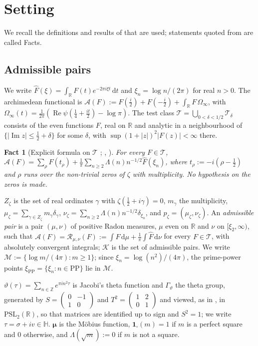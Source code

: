 \documentclass[11pt]{amsart}
\newcommand{\RR}{\mathbb R}
\newcommand{\ZZ}{\mathbb Z}
\newcommand{\dd}{\,\mathrm d}
\renewcommand{\Re}{\operatorname{Re}}
\renewcommand{\Im}{\operatorname{Im}}
\newcommand{\one}{\mathbf 1}
\newcommand{\hF}{\widehat F}
\newcommand{\xin}[1]{\xi_{#1}}
\newcommand{\BRS}{\mathcal M}
\newcommand{\xiPP}{\xi_{\mathrm{PP}}}
\newcommand{\PP}{\mathrm{PP}}
\newcommand{\Zz}{Z_\zeta}
\newcommand{\muz}{\mu_\zeta}
\newcommand{\nuz}{\nu_\zeta}
\newcommand{\pz}{p_\zeta}
\newcommand{\Oinf}{\Omega_\infty}
\newcommand{\Arch}{\mathcal A}
\newcommand{\Tc}{\mathcal T}
\newcommand{\Spec}{\mathcal R}
\newcommand{\Kad}{\mathcal K}
\newcommand{\uqpmat}[4]{\left(\begin{smallmatrix}#1&#2\\#3&#4\end{smallmatrix}\right)}
\newtheorem{fact}[theorem]{Fact}
\theoremstyle{definition}
\theoremstyle{remark}
\numberwithin{equation}{section}
\begin{document}
\section{Setting}\label{sec:setting}

We recall the definitions and results of \cite{PaperI} that are used; statements quoted from \cite{PaperI} are called Facts.

\subsection{Admissible pairs}\label{ssec:pairs}
We write $\hF(\xi)=\int_\RR F(t)e^{-2\pi i\xi t}\dd t$ and $\xin n=\log n/(2\pi)$ for real $n>0$. The archimedean functional is
$\Arch(F):=F(\frac i2)+F(-\frac i2)+\int_\RR F\,\Oinf$, with $\Oinf(t)=\frac1{2\pi}(\Re\psi(\frac14+\frac{it}2)-\log\pi)$. The test class
$\Tc=\bigcup_{0<\delta<1/2}\Tc_\delta$ consists of the even functions $F$, real on $\RR$ and analytic in a neighbourhood of
$\{\lvert\Im z\rvert\le\frac12+\delta\}$ for some $\delta$, with $\sup(1+\lvert z\rvert)^2\lvert F(z)\rvert<\infty$ there.

\begin{fact}[Explicit formula on $\Tc$ {\cite{PaperI}}; {\cite{Wei52}}, {\cite[(1.1)]{BRS}}]\label{lem:explicit-formula}
For every $F\in\Tc$, $\Arch(F)=\sum_\rho F(t_\rho)+\frac1\pi\sum_{n\ge2}\Lambda(n)n^{-1/2}\hF(\xin n)$, where $t_\rho:=-i(\rho-\frac12)$ and
$\rho$ runs over the non-trivial zeros of $\zeta$ with multiplicity. No hypothesis on the zeros is made.
\end{fact}

$\Zz$ is the set of real ordinates $\gamma$ with $\zeta(\frac12+i\gamma)=0$, $m_\gamma$ the multiplicity,
$\muz=\sum_{\gamma\in\Zz}m_\gamma\delta_\gamma$, $\nuz=\sum_{n\ge2}\Lambda(n)n^{-1/2}\delta_{\xin n}$, and $\pz=(\muz,\nuz)$. An
\emph{admissible pair} is a pair $(\mu,\nu)$ of positive Radon measures, $\mu$ even on $\RR$ and $\nu$ on $[\xin2,\infty)$, such
that $\Arch(F)=\Spec_{\mu,\nu}(F):=\int F\dd\mu+\frac1\pi\int\hF\dd\nu$ for every $F\in\Tc$, with absolutely convergent integrals; $\Kad$
is the set of admissible pairs. We write $\BRS:=\{\log m/(4\pi):m\ge1\}$; since $\xin n=\log(n^2)/(4\pi)$, the prime-power points
$\xiPP=\{\xin n:n\in\PP\}$ lie in $\BRS$.

$\vartheta(\tau)=\sum_{n\in\ZZ}e^{\pi in^2\tau}$ is Jacobi's theta function and $\Gamma_\vartheta$ the theta group, generated by
$S=\uqpmat{0}{-1}{1}{0}$ and $T^2=\uqpmat1201$ and viewed, as in \cite{BRS}, in $\mathrm{PSL}_2(\RR)$, so that matrices are identified up to
sign and $S^2=1$; we write $\tau=\sigma+iv\in\mathbb H$. $\boldsymbol\mu$ is the M\"obius function,
$\one_\square(m)=1$ if $m$ is a perfect square and $0$ otherwise, and $\Lambda(\sqrt m):=0$ if $m$ is not a square.
\end{document}
